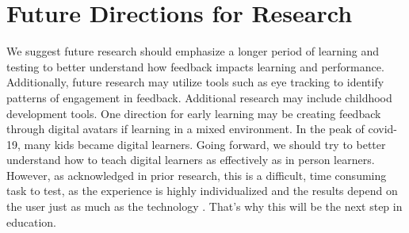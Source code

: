 \documentclass[acmtog]{acmart}
\begin{document}
\section{Future Directions for Research}
We suggest future research should emphasize a longer period of learning and testing to better understand how feedback impacts learning and performance. Additionally, future research may utilize tools such as eye tracking to identify patterns of engagement in feedback. Additional research may include childhood development tools. One direction for early learning may be creating feedback through digital avatars if learning in a mixed environment. In the peak of covid-19, many kids became digital learners. Going forward, we should try to better understand how to teach digital learners as effectively as in person learners. However, as acknowledged in prior research, this is a difficult, time consuming task to test, as the experience is highly individualized and the results depend on the user just as much as the technology \cite{tacoma2021combined}. That's why this will be the next step in education.



\end{document}

